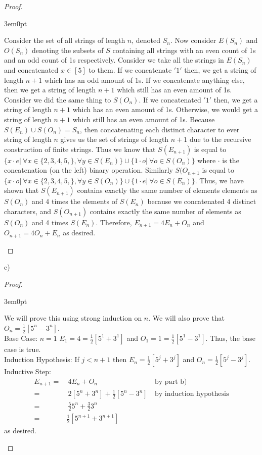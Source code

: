 \documentclass[11pt]{article}
\newenvironment{myproof}
{\begin{proof} \begin{adjustwidth}{3em}{0pt}$ $\par\nobreak\ignorespaces}
{\end{adjustwidth} \end{proof}}
\begin{document}
\begin{flushleft}
\begin{myproof}
Consider the set of all strings of length $n$, denoted $S_n$. Now consider $E(S_n)$ and $O(S_n)$ denoting the subsets of $S$ containing all strings with an even count of 1s and an odd count of 1s respectively. Consider we take all the strings in $E(S_n)$ and concatenated $x \in [5]$ to them. If we concatenate $'1'$ then, we get a string of length $n+1$ which has an odd amount of 1s. If we concatenate anything else, then we get a string of length $n+1$ which still has an even amount of 1s. Consider we did the same thing to $S(O_n)$. If we concatenated $'1'$ then, we get a string of length $n+1$ which has an even amount of 1s. Otherwise, we would get a string of length $n+1$ which still has an even amount of 1s. Because $S(E_n) \cup S(O_n) = S_n$, then concatenating each distinct character to ever string of length $n$ gives us the set of strings of length $n+1$ due to the recursive construction of finite strings. Thus we know that $S(E_{n+1})$ is equal to $\{ x \cdot e | \ \forall x \in \{ 2,3,4,5, \}, \forall y \in S(E_n) \} \cup \{ 1 \cdot o | \ \forall o \in S(O_n) \}$ where $\cdot$ is the concatenation (on the left) binary operation. Similarly $S(O_{n+1}$ is equal to $\{ x \cdot o | \ \forall x \in \{ 2,3,4,5, \}, \forall y \in S(O_n) \} \cup \{ 1 \cdot e | \ \forall o \in S(E_n) \}$. Thus, we have shown that $S(E_{n+1})$ contains exactly the same number of elements elements as $S(O_n)$ and 4 times the elements of $S(E_n)$ because we concatenated 4 distinct characters, and $S(O_{n+1})$ contains exactly the same number of elements as $S(O_n)$ and 4 times $S(E_n)$. Therefore, $E_{n+1} = 4E_n + O_n$ and $O_{n+1} = 4O_n + E_n$ as desired.
\end{myproof}

c)

\begin{myproof}
We will prove this using strong induction on $n$. We will also prove that $O_n = \frac{1}{2}[5^n-3^n]$. \\
\bigskip
Base Case: $n = 1$ $E_1 = 4 = \frac{1}{2}[5^1+3^1]$ and $O_1 = 1 = \frac{1}{2}[5^1-3^1]$. Thus, the base case is true. \\
\bigskip
Induction Hypothesis: If $j < n+1$ then $E_n = \frac{1}{2}[5^j+3^j]$ and $O_n = \frac{1}{2}[5^j-3^j]$. \\
\bigskip
Inductive Step:
\begin{align*}
E_{n+1} = & \ 4 E_n + O_n & \ \text{by part b)} \\
= & \ 2[5^n+3^n] + \frac{1}{2}[5^n-3^n] & \ \text{by induction hypothesis} \\
= & \ \frac{5}{2}5^n + \frac{3}{2}3^n & \\
= & \frac{1}{2}[5^{n+1} + 3^{n+1}] &
\end{align*}
as desired.
\end{myproof}


\end{flushleft}
\end{document}
